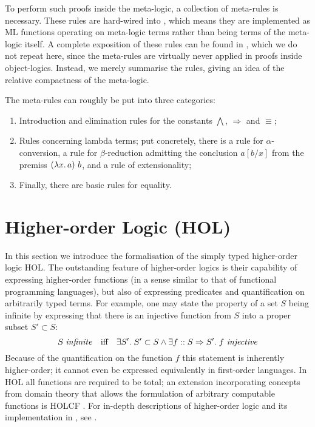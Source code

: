 To perform such proofs inside the meta-logic, a collection of meta-rules is
necessary. These rules are hard-wired into \Isabelle, which means they are
implemented as ML functions operating on meta-logic terms rather than being
terms of the meta-logic itself. A complete exposition of these rules
can be found in \cite[Section 2.4]{Paulson89}, which we do not repeat here,
since the meta-rules are virtually never applied in proofs inside object-logics.
Instead, we merely summarise the rules, giving an idea of the relative
compactness of the meta-logic. 

The meta-rules can roughly be put into three
categories:
\begin{enumerate}
\item Introduction and elimination rules for the constants $\bigwedge$, $\Longrightarrow$
and $\equiv$; 
\item Rules concerning lambda terms; put concretely, there is a rule for
$\alpha$-conversion, a rule for $\beta$-reduction admitting the conclusion $a[b/x]$ from
the premiss $(\LambdaTerm{x}{a})\ b$, and a rule of extensionality; 
\item  Finally,
there are basic rules for equality.
\end{enumerate}

\section{Higher-order Logic (HOL)}
\label{sec:higher-order-logic}

In this section we introduce the formalisation of the simply typed higher-order
logic HOL. The outstanding feature of higher-order logics is their
capability of expressing higher-order functions (in a sense similar to that of
functional programming languages), but also of expressing predicates and
quantification on arbitrarily typed terms. For example, one may state the
property of a set $S$ being infinite by expressing that there is an injective
function from $S$ into a proper subset $S' \subset S$:
\[
S\;\mathit{infinite} \quad\text{iff}\quad \exists S'.\; S' \subset S\land\exists f :: S \Rightarrow S'.\; f\
\mathit{injective}
\]
Because of the quantification on the function $f$ this statement is inherently
higher-order; it cannot even be expressed equivalently in first-order languages.
In HOL all functions are required to
be total; an extension incorporating concepts from domain theory that allows the
formulation of arbitrary computable functions is HOLCF
\cite{MuellerNipkowOheimbSlotosch}.  For in-depth descriptions of higher-order
logic and its implementation in \Isabelle, see \cite{Andrews00,IsabelleHOL}.


